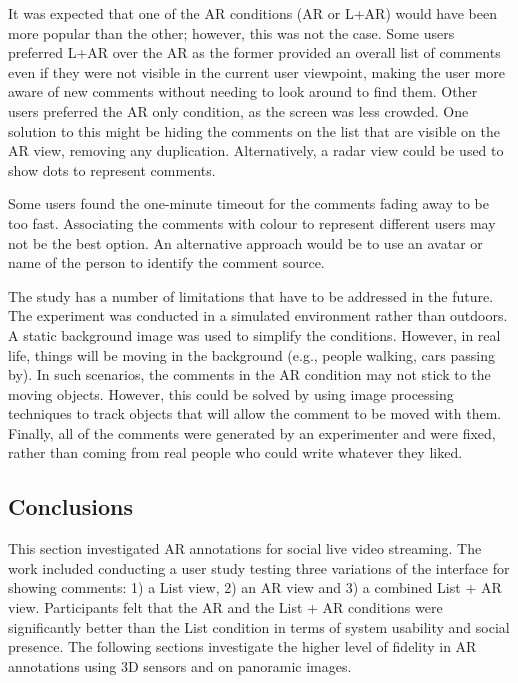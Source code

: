 It was expected that one of the AR conditions (AR or L+AR) would have been more popular than the other; however, this was not the case. Some users preferred L+AR over the AR as the former provided an overall list of comments even if they were not visible in the current user viewpoint, making the user more aware of new comments without needing to look around to find them. Other users preferred the AR only condition, as the screen was less crowded. One solution to this might be hiding the comments on the list that are visible on the AR view, removing any duplication. Alternatively, a radar view could be used to show dots to represent comments. 

Some users found the one-minute timeout for the comments fading away to be too fast. Associating the comments with colour to represent different users may not be the best option. An alternative approach would be to use an avatar or name of the person to identify the comment source. 

The study has a number of limitations that have to be addressed in the future. The experiment was conducted in a simulated environment rather than outdoors. A static background image was used to simplify the conditions. However, in real life, things will be moving in the background (e.g., people walking, cars passing by). In such scenarios, the comments in the AR condition may not stick to the moving objects. However, this could be solved by using image processing techniques to track objects that will allow the comment to be moved with them. Finally, all of the comments were generated by an experimenter and were fixed, rather than coming from real people who could write whatever they liked.    

\subsection{Conclusions}

This section investigated AR annotations for social live video streaming. The work included conducting a user study testing three variations of the interface for showing comments: 1) a List view, 2) an AR view and 3) a combined List + AR view. Participants felt that the AR and the List + AR conditions were significantly better than the List condition in terms of system usability and social presence. The following sections investigate the higher level of fidelity in AR annotations using 3D sensors and on panoramic images. 